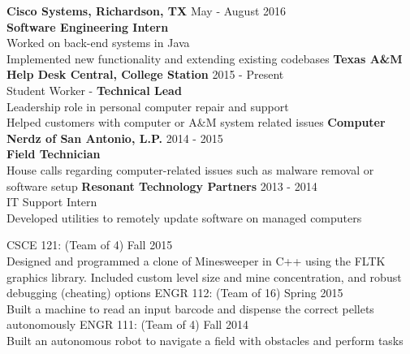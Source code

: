 \documentclass[12pt]{article}
\begin{document}
\begin{flushleft}
\begin{outline}[compactitem]
  \1 \textbf{Cisco Systems, Richardson, TX} \hfill May - August 2016
  \\ \textbf{Software Engineering Intern}
  \\ Worked on back-end systems in Java
  \\ Implemented new functionality and extending existing codebases
  \1 \textbf{Texas A\&M Help Desk Central, College Station} \hfill 2015 - Present
    \\ Student Worker - \textbf{Technical Lead}
    \\ Leadership role in personal computer repair and support
    \\ Helped customers with computer or A\&M system related issues
  \1 \textbf{Computer Nerdz of San Antonio, L.P.} \hfill 2014 - 2015
    \\ \textbf{Field Technician}
    \\ House calls regarding computer-related issues such as malware removal or software setup
  \1 \textbf{Resonant Technology Partners} \hfill 2013 - 2014
    \\ IT Support Intern
    \\ Developed utilities to remotely update software on managed computers

  \1 CSCE 121:  (Team of 4) \hfill Fall 2015 
    \\ Designed and programmed a clone of Minesweeper in C++ using the FLTK graphics library. Included custom level size and mine concentration, and robust debugging (cheating) options
  \1 ENGR 112: (Team of 16) \hfill Spring 2015
    \\ Built a machine to read an input barcode and dispense the correct pellets autonomously 
  \1 ENGR 111: (Team of 4) \hfill Fall 2014
    \\ Built an autonomous robot to navigate a field with obstacles and perform tasks


\end{outline}
\end{flushleft}
\end{document}
